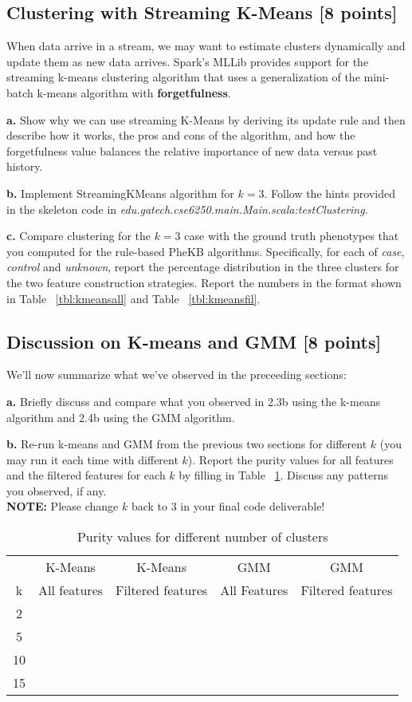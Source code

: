 \documentclass[12pt]{article}
\begin{document}
\subsection{Clustering with Streaming K-Means  [8 points]}
When data arrive in a stream, we may want to estimate clusters dynamically and update them as new data arrives. Spark's MLLib provides support for the streaming k-means clustering algorithm that uses a generalization of the mini-batch k-means algorithm with \textbf{forgetfulness}.

\textbf{a.} Show why we can use streaming K-Means by deriving its update rule and then describe how it works, the pros and cons of the algorithm, and how the forgetfulness value balances the relative importance of new data versus past history.

\textbf{b.} Implement StreamingKMeans algorithm  for $k=3$. Follow the hints provided in the skeleton code in \textit{edu.gatech.cse6250.main.Main.scala:testClustering}.

\textbf{c.} Compare clustering for the $k=3$ case with the ground truth phenotypes that you computed for the rule-based PheKB algorithms. Specifically, for each of \textit{case}, \textit{control} and \textit{unknown}, report the percentage distribution in the three clusters for the two feature construction strategies. Report the numbers in the format shown in Table ~\ref{tbl:kmeansall} and Table ~\ref{tbl:kmeansfil}. 

\subsection{Discussion on K-means and GMM [8 points]}

We'll now summarize what we've observed in the preceeding sections:

\textbf{a.} Briefly discuss and compare what you observed in 2.3b using the k-means algorithm and 2.4b using the GMM algorithm.

\textbf{b.} Re-run k-means and GMM from the previous two sections for different $k$ (you may run it each time with different $k$). Report the purity values for all features and the filtered features for each $k$ by filling in Table ~\ref{tbl:kpurity}. Discuss any patterns you observed, if any. \\

\textbf{NOTE:} Please change $k$ back to 3 in your final code deliverable!

\begin{table}[h]
\centering
\begin{tabular}{ c | c | c | c | c}
  \hline
   & K-Means & K-Means & GMM & GMM\\
  k & All features & Filtered features & All Features & Filtered features \\
  \hline
  2 &   &  &  & \\
  5 &   &  &  & \\
  10 &   &  &  & \\
  15 &   &  &  & \\
  \hline  
\end{tabular}
\caption{Purity values for different number of clusters}
\label{tbl:kpurity}
\end{table}
\end{document}
